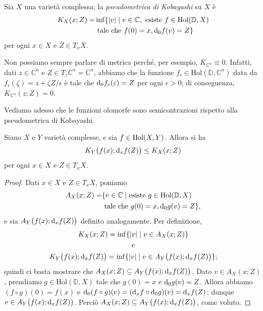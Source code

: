 \begin{defn}
    Sia $X$ una varietà complessa; la \textit{pseudometrica di Kobayashi} su $X$ è
    \begin{equation}\begin{split}
        K_X(x;Z)=&\inf\{|v| \mid v \in \mathbb{C}, \text{ esiste }f \in \text{Hol}(\mathbb{D},X) \\
        &\text{ tale che } f(0)=x, \mathop{}\!\mathrm{d}_0 f(v)=Z\}
    \end{split}\end{equation}
    per ogni $x \in X$ e $Z \in T_xX$.
\end{defn}

\begin{oss} \label{metr_noncr}
    Non possiamo sempre parlare di metrica perché, per esempio, $K_{\mathbb{C}^n}\equiv 0$. Infatti, dati $z\in\mathbb{C}^n$ e $Z\in T_z\mathbb{C}^n=\mathbb{C}^n$, abbiamo che la funzione $f_\epsilon\in\text{Hol}(\mathbb{D},\mathbb{C}^n)$ data da $f_\epsilon(\zeta)=z+\zeta Z/\epsilon$ è tale che $\mathop{}\!\mathrm{d}_0 f_\varepsilon(\varepsilon)=Z$ per ogni $\epsilon>0$; di conseguenza, $K_{\mathbb{C}^n}(z;Z)=0$.
\end{oss}

Vediamo adesso che le funzioni olomorfe sono semicontrazioni rispetto alla pseudometrica di Kobayashi.

\begin{prop} \label{metrdecr}
    Siano $X$ e $Y$ varietà complesse, e sia $f \in \textnormal{Hol}(X,Y)$. Allora si ha
    \begin{equation}
        K_Y\big(f(x);\mathop{}\!\mathrm{d}_x f(Z)\big) \le K_X(x;Z)
    \end{equation}
    per ogni $x \in X$ e $Z \in T_xX$.
\end{prop}

\begin{proof}
    Dati $x\in X$ e $Z\in T_xX$, poniamo
    \begin{align*}
        A_X(x;Z)=&\{v \in \mathbb{C} \mid \text{esiste }g \in \text{Hol}(\mathbb{D},X) \\
        &\text{ tale che } g(0)=x, \mathop{}\!\mathrm{d}_0 g(v)=Z\},
    \end{align*}
    e sia $A_Y\big(f(x);\mathop{}\!\mathrm{d}_x f(Z)\big)$ definito analogamente. Per definizione,
    \begin{gather*}
        K_X(x;Z)=\inf\{|v|\mid v\in A_X(x;Z)\}\\
        \text{ e }\\
        K_Y\big(f(x);\mathop{}\!\mathrm{d}_x f(Z)\big)=\inf\{|v|\mid v\in A_Y\big(f(x);\mathop{}\!\mathrm{d}_x f(Z)\big)\};
    \end{gather*}
    quindi ci basta mostrare che $A_X(x;Z)\subseteq A_Y\big(f(x);\mathop{}\!\mathrm{d}_x f(Z)\big)$. Dato $v\in A_X(x;Z)$, prendiamo $g\in\text{Hol}(\mathbb{D},X)$ tale che $g(0)=x$ e $\mathop{}\!\mathrm{d}_0 g(v)=Z$. Allora abbiamo $(f\circ g)(0)=f(x)$ e $\mathop{}\!\mathrm{d}_0(f\circ g)(v)=(\mathop{}\!\mathrm{d}_x f\circ\mathop{}\!\mathrm{d}_0 g)(v)=\mathop{}\!\mathrm{d}_x f(Z)$; dunque $v \in A_Y\big(f(x);\mathop{}\!\mathrm{d}_x f(Z)\big)$. Perciò $A_X(x;Z)\subseteq A_Y\big(f(x);\mathop{}\!\mathrm{d}_x f(Z)\big)$, come voluto.
\end{proof}

